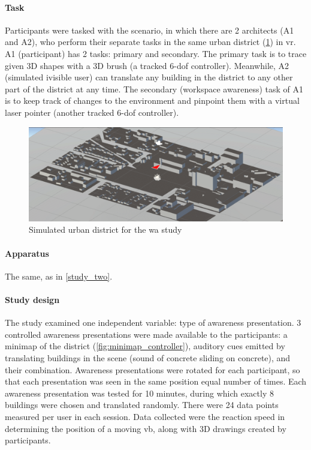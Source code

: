 \paragraph{Task}
Participants were tasked with the scenario, in which there are 2 architects (A1 and A2), who perform their separate tasks in the same urban district (\ref{fig:urbandistrict}) in \gls{vr}. A1 (participant) has 2 tasks: primary and secondary. The primary task is to trace given 3D shapes with a 3D brush (a tracked 6-\gls{dof} controller). Meanwhile, A2 (simulated ivisible user) can translate any building in the district to any other part of the district at any time. The secondary (workspace awareness) task of A1 is to keep track of changes to the environment and pinpoint them with a virtual laser pointer (another tracked 6-\gls{dof} controller).

\begin{figure}
	\centering
	\includegraphics[width=0.7\linewidth]{figures/urban_district}
	\caption{Simulated urban district for the \gls{wa} study}
	\label{fig:urbandistrict}
\end{figure}


\paragraph{Apparatus} The same, as in \ref{study_two}.

\paragraph{Study design}
The study examined one independent variable: type of awareness presentation. 3 controlled awareness presentations  were made available to the participants: a minimap of the district (\ref{fig:minimap_controller}), auditory cues emitted by translating buildings in the scene (sound of concrete sliding on concrete), and their combination. Awareness presentations were rotated for each participant, so that each presentation was seen in the same position equal number of times. 
Each awareness presentation was tested for 10 minutes, during which exactly 8 buildings were chosen and translated randomly. There were 24 data points measured per user in each session. Data collected were the reaction speed in determining the position of a moving \gls{vb}, along with 3D drawings created by participants.


